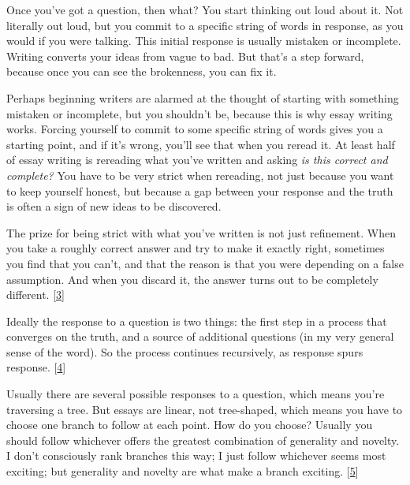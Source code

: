 Once you've got a question, then what? You start
                  thinking out loud about it. Not literally out loud, but you
                  commit to a specific string of words in response, as you would
                  if you were talking. This initial response is usually mistaken
                  or incomplete. Writing converts your ideas from vague to bad.
                  But that's a step forward, because once you can see the
                  brokenness, you can fix it.

Perhaps beginning
                  writers are alarmed at the thought of starting with something
                  mistaken or incomplete, but you shouldn't be, because this is
                  why essay writing works. Forcing yourself to commit to some
                  specific string of words gives you a starting point, and if
                  it's wrong, you'll see that when you reread it. At least half
                  of essay writing is rereading what you've written and asking
                  \emph{is this correct and complete?} You have to be very
                  strict when rereading, not just because you want to keep
                  yourself honest, but because a gap between your response and
                  the truth is often a sign of new ideas to be discovered.

The
                  prize for being strict with what you've written is not just
                  refinement. When you take a roughly correct answer and try to
                  make it exactly right, sometimes you find that you can't, and
                  that the reason is that you were depending on a false
                  assumption. And when you discard it, the answer turns out to
                  be completely different.
                  [\href{\#f3n}{3}]

Ideally the response to a question is two things:
                  the first step in a process that converges on the truth, and a
                  source of additional questions (in my very general sense of
                  the word). So the process continues recursively, as response
                  spurs response.
                  [\href{\#f4n}{4}]

Usually there are several possible responses to a
                  question, which means you're traversing a tree. But essays are
                  linear, not tree-shaped, which means you have to choose one
                  branch to follow at each point. How do you choose? Usually you
                  should follow whichever offers the greatest combination of
                  generality and novelty. I don't consciously rank branches this
                  way; I just follow whichever seems most exciting; but
                  generality and novelty are what make a branch exciting.
                  [\href{\#f5n}{5}]

